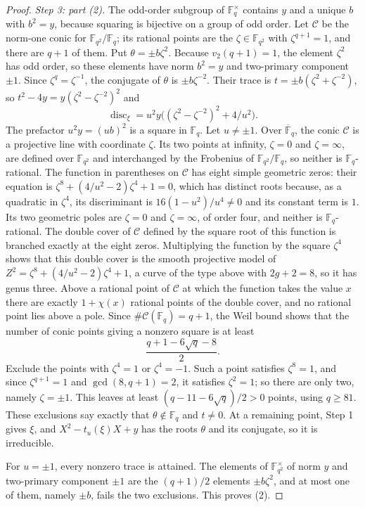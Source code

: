 \documentclass[11pt]{article}
\theoremstyle{plain}
\theoremstyle{definition}
\theoremstyle{remark}
\newcommand{\F}{\mathbb F}
\begin{document}
\begin{proof}
\emph{Step 3: part (2).}  The odd-order subgroup of $\F_q^\times$ contains
$y$ and a unique $b$ with $b^2=y$, because squaring is bijective on a group
of odd order.  Let $\mathcal C$ be the norm-one conic for
$\F_{q^2}/\F_q$; its rational points are the $\zeta\in\F_{q^2}$ with
$\zeta^{q+1}=1$, and there are $q+1$ of them.  Put $\theta=\pm b\zeta^2$.
Because $v_2(q+1)=1$, the element $\zeta^2$ has odd order, so these
elements have norm $b^2=y$ and two-primary component $\pm1$.  Since
$\zeta^q=\zeta^{-1}$, the conjugate of $\theta$ is $\pm b\zeta^{-2}$.  Their
trace is $t=\pm b(\zeta^2+\zeta^{-2})$, so
$t^2-4y=y(\zeta^2-\zeta^{-2})^2$ and
\[
 \operatorname{disc}_\xi=u^2y\bigl((\zeta^2-\zeta^{-2})^2+4/u^2\bigr).
\]
The prefactor $u^2y=(ub)^2$ is a square in $\F_q$.  Let $u\ne\pm1$.  Over
$\overline{\F}_q$, the conic $\mathcal C$ is a projective line with
coordinate $\zeta$.  Its two points at infinity, $\zeta=0$ and
$\zeta=\infty$, are defined over $\F_{q^2}$ and interchanged by the
Frobenius of $\F_{q^2}/\F_q$, so neither is $\F_q$-rational.  The function in
parentheses on $\mathcal C$ has eight simple geometric zeros: their
equation is $\zeta^8+(4/u^2-2)\zeta^4+1=0$, which has distinct roots
because, as a quadratic in $\zeta^4$, its discriminant is
$16(1-u^2)/u^4\ne0$ and its constant term is $1$.  Its two geometric poles
are $\zeta=0$ and $\zeta=\infty$, of order four, and neither is
$\F_q$-rational.  The double cover of $\mathcal C$ defined by the square
root of this function is branched exactly at the eight zeros.  Multiplying
the function by the square $\zeta^4$ shows that this double cover is the
smooth projective model of $Z^2=\zeta^8+(4/u^2-2)\zeta^4+1$, a curve of the
type above with $2g+2=8$, so it has genus three.  Above a rational point of
$\mathcal C$ at which the function takes the value $x$ there are exactly
$1+\chi(x)$ rational points of the double cover, and no rational point
lies above a pole.  Since $\#\mathcal C(\F_q)=q+1$, the
Weil bound shows that the number of conic points giving a nonzero square
is at least
\[
 \frac{q+1-6\sqrt q-8}{2}.
\]
Exclude the points with $\zeta^4=1$ or $\zeta^4=-1$.  Such a point
satisfies $\zeta^8=1$, and since $\zeta^{q+1}=1$ and $\gcd(8,q+1)=2$, it
satisfies $\zeta^2=1$; so there are only two, namely $\zeta=\pm1$.  This
leaves at least $(q-11-6\sqrt q)/2>0$ points, using $q\ge81$.  These
exclusions say exactly that $\theta\notin\F_q$ and $t\ne0$.  At a remaining
point, Step 1 gives $\xi$, and $X^2-t_u(\xi)X+y$ has the roots $\theta$ and its
conjugate, so it is irreducible.

For $u=\pm1$, every nonzero trace is attained.  The elements of
$\F_{q^2}^\times$ of norm $y$ and two-primary component $\pm1$ are the
$(q+1)/2$ elements $\pm b\zeta^2$, and at most one of them, namely
$\pm b$, fails the two exclusions.  This proves (2).
\end{proof}
\end{document}
